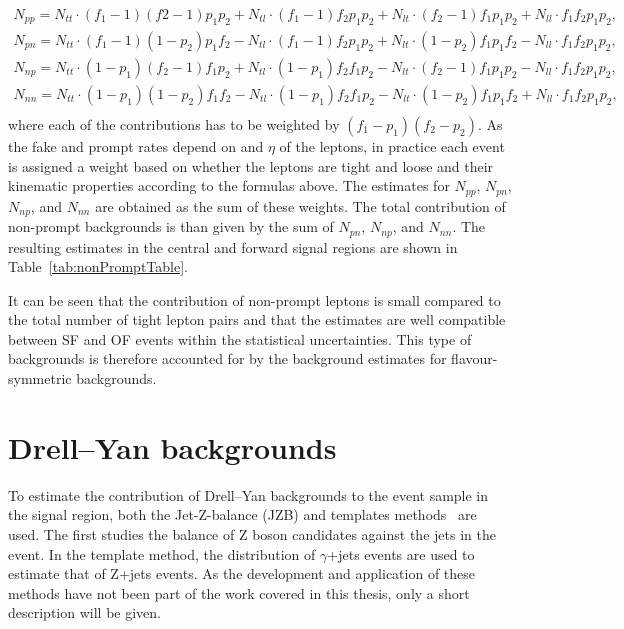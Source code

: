 \begin{eqnarray*}
N_{pp} = N_{tt}\cdot(f_1 -1)(f2-1)p_1p_2 + N_{tl}\cdot(f_1 -1)f_2p_1p_2 + N_{lt}\cdot (f_2-1)f_1p_1p_2 + N_{ll}\cdot f_1f_2p_1p_2,\\
N_{pn} = N_{tt}\cdot(f_1 -1)(1-p_2)p_1f_2 - N_{tl}\cdot(f_1 -1)f_2p_1p_2 + N_{lt}\cdot (1-p_2)f_1p_1f_2 - N_{ll}\cdot f_1f_2p_1p_2,\\
N_{np} = N_{tt}\cdot(1 - p_1)(f_2 - 1)f_1p_2 + N_{tl}\cdot(1-p_1)f_2f_1p_2 - N_{lt}\cdot (f_2-1)f_1p_1p_2 - N_{ll}\cdot f_1f_2p_1p_2,\\
N_{nn} = N_{tt}\cdot(1-p_1)(1-p_2)f_1f_2 - N_{tl}\cdot (1-p_1)f_2f_1p_2 - N_{lt}\cdot (1-p_2)f_1p_1f_2 + N_{ll}\cdot f_1f_2p_1p_2,\\
\end{eqnarray*}
where each of the contributions has to be weighted by $(f_1-p_1)(f_2-p_2)$. As the fake and prompt rates depend on \pt and $\eta$ of the leptons, in practice each event is assigned a weight based on whether the leptons are tight and loose and their kinematic properties according to the formulas above. The estimates for $N_{pp}$, $N_{pn}$, $N_{np}$, and $N_{nn}$ are obtained as the sum of these weights. The total contribution of non-prompt backgrounds is than given by the sum of $N_{pn}$, $N_{np}$, and $N_{nn}$. The resulting estimates in the central and forward signal regions are shown in Table~\ref{tab:nonPromptTable}. 

It can be seen that the contribution of non-prompt leptons is small compared to the total number of tight lepton pairs and that the estimates are well compatible between SF and OF events within the statistical uncertainties. This type of backgrounds is therefore accounted for by the background estimates for flavour-symmetric backgrounds.

\section{Drell--Yan backgrounds}
To estimate the contribution of Drell--Yan backgrounds to the event sample in the signal region, both the Jet-Z-balance (JZB) and \MET templates methods~\cite{Chatrchyan:2012qka} are used. The first studies the balance of Z boson candidates against the jets in the event. In the \MET template method, the \MET distribution of $\gamma$+jets events are used to estimate that of Z+jets events. As the development and application of these methods have not been part of the work covered in this thesis, only a short description will be given.
